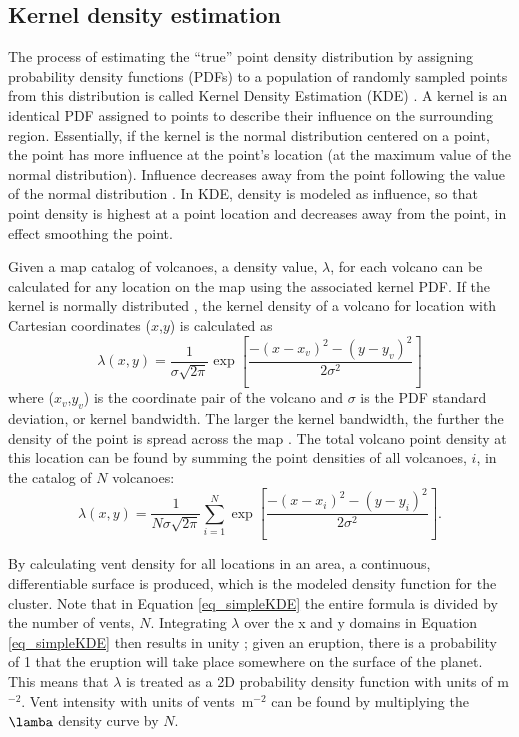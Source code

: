 \subsection{Kernel density estimation}\label{sec_kde}
The process of estimating the ``true'' point density distribution by assigning probability density functions (PDFs) to a population of randomly sampled points from this distribution is called Kernel Density Estimation (KDE) \citep{silverman1986density}. A kernel is an identical PDF assigned to points to describe their influence on the surrounding region. Essentially, if the kernel is the normal distribution centered on a point, the point has more influence at the point's location (at the maximum value of the normal distribution). Influence decreases away from the point following the value of the normal distribution \citep{lutz1995improved}. In KDE, density is modeled as influence, so that point density is highest at a point location and decreases away from the point, in effect smoothing the point.

Given a map catalog of volcanoes, a density value, $\lambda$, for each volcano can be calculated for any location on the map using the associated kernel PDF. If the kernel is normally distributed \citep{conway1998recurrence}, the kernel density of a volcano for location with Cartesian coordinates ($x$,$y$) is calculated as
\begin{equation}
\lambda(x,y) = \frac{1}{\sigma\sqrt{2\pi}}\exp\left[\frac{-(x-x_v)^2-(y-y_v)^2}{2\sigma^2}\right]
\end{equation}
where ($x_v$,$y_v$) is the coordinate pair of the volcano and $\sigma$ is the PDF standard deviation, or kernel bandwidth. The larger the kernel bandwidth, the further the density of the point is spread across the map \citep{lutz1995improved}. The total volcano point density at this location can be found by summing the point densities of all volcanoes, $i$, in the catalog of $N$ volcanoes:
\begin{equation}
\lambda(x,y) = \frac{1}{N\sigma\sqrt{2\pi}}\sum\limits_{i=1}^{N}\exp\left[\frac{-(x-x_i)^2-(y-y_i)^2}{2\sigma^2}\right].
\label{eq_simpleKDE}
\end{equation}

By calculating vent density for all locations in an area, a continuous, differentiable surface is produced, which is the modeled density function for the cluster. Note that in Equation \ref{eq_simpleKDE} the entire formula is divided by the number of vents, $N$. Integrating $\lambda$ over the x and y domains in Equation \ref{eq_simpleKDE} then results in unity \citep{connor2015probabilistic}; given an eruption, there is a probability of 1 that the eruption will take place somewhere on the surface of the planet. This means that $\lambda$ is treated as a 2D probability density function with units of m$^{-2}$. Vent intensity with units of vents~m$^{-2}$ can be found by multiplying the $\lamba$ density curve by $N$.


